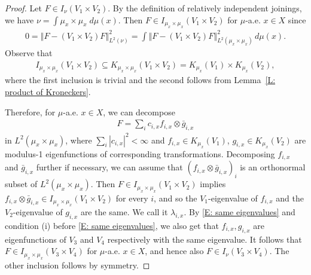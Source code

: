 \documentclass[11pt]{amsart}
\theoremstyle{definition}
\newcommand{\norm}[1]{\left\Vert #1\right\Vert}
\newcommand{\1}{{\mathbf{1}}}
\begin{document}
\begin{proof}
    Let $F\in I_{\nu}(V_1\times V_2)$. By the definition of relatively independent joinings, we have $\nu = \int \mu_x \times \mu_x\; d\mu(x)$.
    Then $F\in I_{\mu_x \times \mu_x}(V_1\times V_2)$ for $\mu$-a.e. $x\in X$ since
    \begin{align*}
        0 = \norm{F-(V_1\times V_2)F}_{L^2(\nu)}^2 = \int \norm{F-(V_1\times V_2)F}_{L^2(\mu_x\times \mu_x)}^2 \,d\mu(x).
    \end{align*}
    Observe that
    \begin{align*}
        I_{\mu_x \times \mu_x}(V_1\times V_2) \subseteq K_{\mu_x\times \mu_x}(V_1\times V_2)= K_{\mu_x}(V_1)\times K_{\mu_x}(V_2),
    \end{align*}
    where the first inclusion is trivial and the second follows from Lemma~\ref{L: product of Kroneckers}.

    
    Therefore, for $\mu$-a.e. $x\in X$, we can decompose
    \begin{align*}
        F = \sum_i c_{i,x} f_{i,x}\otimes \bar g_{i,x}
    \end{align*}
    in {$L^2(\mu_x\times \mu_{x})$}, where $\sum_i|c_{i,x}|^2<\infty$ and $f_{i,x}\in K_{\mu_x}(V_1)$, $g_{i,x}\in K_{\mu_x}(V_2)$ are modulus-1 eigenfunctions of corresponding transformations. %
    Decomposing $f_{i,x}$ and $\bar g_{i,x}$ further if necessary, we can assume that $(f_{i,x}\otimes \bar g_{i,x})_i$ is an orthonormal subset of $L^2(\mu_x\times \mu_{x})$. Then $F\in I_{\mu_x \times \mu_x}(V_1\times V_2)$ implies $f_{i,x}\otimes \bar g_{i,x}\in I_{\mu_x \times \mu_x}(V_1\times V_2)$ for every $i$, and so the $V_1$-eigenvalue of $f_{i,x}$ and the $V_2$-eigenvalue of $g_{i,x}$ are the same. We call it $\lambda_{i,x}$. By \eqref{E: same eigenvalues} {and condition (i) before \eqref{E: same eigenvalues}}, we also get that $f_{i,x}, g_{i,x}$ are eigenfunctions of $V_3$ and $V_4$ respectively with the same eigenvalue. It follows that $F\in I_{\mu_x\times \mu_x}(V_3\times V_4)$ for $\mu$-a.e. $x\in X$, and hence also $F\in I_{\nu}(V_3\times V_4)$. The other inclusion follows by symmetry.
\end{proof}
\end{document}
